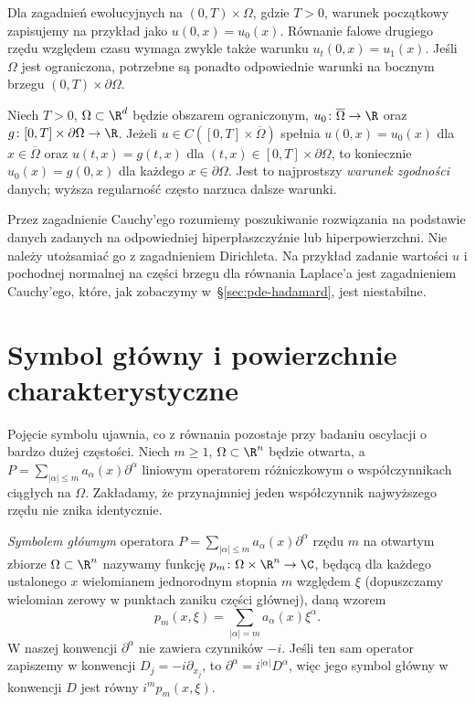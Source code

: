 Dla zagadnień ewolucyjnych na $(0,T)\times\Omega$, gdzie $T>0$,
warunek początkowy zapisujemy na przykład jako $u(0,x)=u_0(x)$.
Równanie falowe drugiego rzędu względem czasu wymaga zwykle także
warunku $u_t(0,x)=u_1(x)$. Jeśli $\Omega$ jest ograniczona,
potrzebne są ponadto odpowiednie warunki na bocznym brzegu
$(0,T)\times\partial\Omega$.

\begin{przyklad}
Niech $T>0$, $\Omega\subset\R^d$ będzie obszarem ograniczonym,
$u_0\colon\overline\Omega\to\R$ oraz
$g\colon[0,T]\times\partial\Omega\to\R$.
Jeżeli $u\in C([0,T]\times\overline\Omega)$ spełnia
$u(0,x)=u_0(x)$ dla $x\in\overline\Omega$ oraz
$u(t,x)=g(t,x)$ dla $(t,x)\in[0,T]\times\partial\Omega$,
to koniecznie $u_0(x)=g(0,x)$ dla każdego $x\in\partial\Omega$.
Jest to najprostszy \emph{warunek zgodności} danych; wyższa
regularność często narzuca dalsze warunki.
\end{przyklad}

\begin{uwaga}
Przez zagadnienie Cauchy'ego rozumiemy poszukiwanie rozwiązania
na podstawie danych zadanych na odpowiedniej hiperpłaszczyźnie
lub hiperpowierzchni. Nie należy utożsamiać go z zagadnieniem
Dirichleta. Na przykład zadanie wartości $u$ i pochodnej normalnej
na części brzegu dla równania Laplace'a jest zagadnieniem Cauchy'ego,
które, jak zobaczymy w~\S\ref{sec:pde-hadamard}, jest niestabilne.
\end{uwaga}

\section{Symbol główny i powierzchnie charakterystyczne}
\label{sec:pde-symbol}

Pojęcie symbolu ujawnia, co z równania pozostaje przy badaniu
oscylacji o bardzo dużej częstości. Niech $m\geq1$,
$\Omega\subset\R^n$ będzie otwarta, a
$P=\sum_{|\alpha|\leq m}a_\alpha(x)\partial^\alpha$
liniowym operatorem różniczkowym o współczynnikach ciągłych
na $\Omega$. Zakładamy, że przynajmniej jeden współczynnik
najwyższego rzędu nie znika identycznie.

\begin{definicja}
\emph{Symbolem głównym} operatora
$P=\sum_{|\alpha|\leq m}a_\alpha(x)\partial^\alpha$ rzędu $m$
na otwartym zbiorze $\Omega\subset\R^n$ nazywamy funkcję
$p_m\colon\Omega\times\R^n\to\C$, będącą dla każdego ustalonego $x$
wielomianem jednorodnym stopnia $m$ względem $\xi$ (dopuszczamy
wielomian zerowy w punktach zaniku części głównej), daną wzorem
\begin{equation}\label{eq:principal-symbol}
 p_m(x,\xi)=\sum_{|\alpha|=m}a_\alpha(x)\xi^\alpha.
\end{equation}
W naszej konwencji $\partial^\alpha$ nie zawiera czynników $-i$.
Jeśli ten sam operator zapiszemy w konwencji $D_j=-i\partial_{x_j}$,
to $\partial^\alpha=i^{|\alpha|}D^\alpha$, więc jego symbol główny
w konwencji $D$ jest równy $i^mp_m(x,\xi)$.
\end{definicja}

